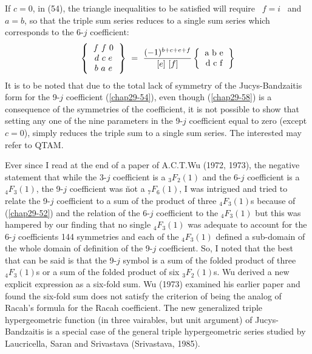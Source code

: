 If $c=0$, in (54), the triangle inequalities to be satisfied will require \ $f=i$
\ and \ $a=b$, so that the triple sum series reduces to a single sum series which 
corresponds to the 6-$j$ coefficient:
\begin{equation}
\left\{
\begin{tabular}{c}
$f \ f \ 0$\\  
$d \ c\ e$\\ 
$b \ a \ e$\\ 
\end{tabular} 
\right\} \
=\ \frac{(-1)^{b+c+e+f}}{[e]\ [f]}
\left\{
\begin{tabular} {c} 
a\ b\ e\\ 
d\ c\ f \\ 
\end{tabular} 
\right\} \label{chap29-eq58}
\end{equation}
It is to be noted that due to the total lack of symmetry of the Jucys-Bandzaitis 
form for the 9-$j$ coefficient (\eqref{chap29-54}), even though (\eqref{chap29-58}) is a consequence of the symmetries of the coefficient, it is not possible to show that setting any one of the nine 
parameters in the 9-$j$ coefficient equal to zero (except $c=0$), simply reduces the 
triple sum to a single sum series. The interested may refer to QTAM.

Ever since I read at the end of a paper of A.C.T.Wu (1972, 1973), the negative statement
that while the 3-$j$ coefficient is a $_3F_2(1)$ and the 6-$j$ coefficient is a $_4F_3(1)$,
the 9-$j$ coefficient was \u{not} a $_7F_6(1)$, I was intrigued and tried to relate
the 9-$j$ coefficient to a sum of the product of three $_4F_3(1)$s because of (\eqref{chap29-52}) and
the relation of the 6-$j$ coefficient to the $_4F_3(1)$ but this was hampered by our 
finding that no single $_4F_3(1)$ was adequate to account for the 6-$j$ coefficients 144 
symmetries and each of the $_4F_3(1)$ defined a sub-domain of the whole domain of definition
of the  9-$j$ coefficient. So, I noted that the best that can be said is that the 9-$j$ symbol
is a sum of the folded product of three $_4F_3(1)$s or a sum of the folded product of six 
$_3F_2(1)$s. Wu derived a new explicit expression as a six-fold sum. Wu (1973) examined his 
earlier paper and found the six-fold sum does not satisfy the criterion of being the analog
of Racah's formula for the Racah coefficient. The new generalized triple hypergeometric function
(in three vairables, but unit argument) of Jucys-Bandzaitis is a special case of the general triple
hypergeometric series studied by Laucricella, Saran and Srivastava (Srivastava, 1985).

